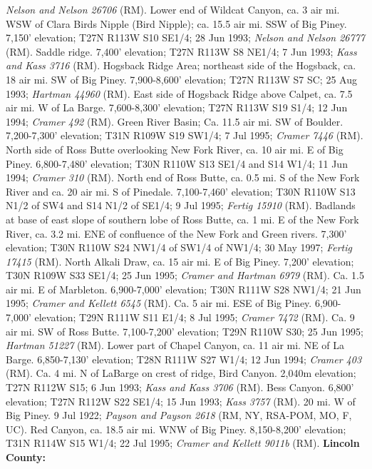 \textit{Nelson and Nelson 26706} (RM).
Lower end of Wildcat Canyon, ca. 3 air mi. WSW of Clara Birds Nipple
(Bird Nipple); ca. 15.5 air mi. SSW of Big Piney. 7,150’ elevation;
T27N R113W S10 SE1/4; 28 Jun 1993; \textit{Nelson and Nelson 26777} (RM).
Saddle ridge. 7,400’ elevation; T27N R113W S8 NE1/4; 7 Jun 1993;
\textit{Kass and Kass 3716} (RM).
Hogsback Ridge Area; northeast side of the Hogsback, ca. 18 air mi. SW of
Big Piney. 7,900-8,600’ elevation; T27N R113W S7 SC; 25 Aug 1993;
\textit{Hartman 44960} (RM).
East side of Hogsback Ridge above Calpet, ca. 7.5 air mi. W of La Barge.
7,600-8,300’ elevation; T27N R113W S19 S1/4; 12 Jun 1994;
\textit{Cramer 492} (RM).
Green River Basin; Ca. 11.5 air mi. SW of Boulder. 7,200-7,300’ elevation;
T31N R109W S19 SW1/4; 7 Jul 1995; \textit{Cramer 7446} (RM).
North side of Ross Butte overlooking New Fork River, ca. 10 air mi. E of
Big Piney. 6,800-7,480’ elevation; T30N R110W S13 SE1/4 and S14 W1/4;
11 Jun 1994; \textit{Cramer 310} (RM).
North end of Ross Butte, ca. 0.5 mi. S of the New Fork River and ca. 20 air mi.
S of Pinedale. 7,100-7,460’ elevation; T30N R110W S13 N1/2 of SW4 and S14 N1/2
of SE1/4; 9 Jul 1995; \textit{Fertig 15910} (RM).
Badlands at base of east slope of southern lobe of Ross Butte, ca. 1 mi. E of
the New Fork River, ca. 3.2 mi. ENE of confluence of the New Fork and Green
rivers. 7,300’ elevation; T30N R110W S24 NW1/4 of SW1/4 of NW1/4; 30 May 1997;
\textit{Fertig 17415} (RM).
North Alkali Draw, ca. 15 air mi. E of Big Piney. 7,200’ elevation;
T30N R109W S33 SE1/4; 25 Jun 1995; \textit{Cramer and Hartman 6979} (RM).
Ca. 1.5 air mi. E of Marbleton. 6,900-7,000’ elevation; T30N R111W S28 NW1/4;
21 Jun 1995; \textit{Cramer and Kellett 6545} (RM).
Ca. 5 air mi. ESE of Big Piney. 6,900-7,000’ elevation; T29N R111W S11 E1/4;
8 Jul 1995; \textit{Cramer 7472} (RM).
Ca. 9 air mi. SW of Ross Butte. 7,100-7,200’ elevation; T29N R110W S30;
25 Jun 1995; \textit{Hartman 51227} (RM).
Lower part of Chapel Canyon, ca. 11 air mi. NE of La Barge.
6,850-7,130’ elevation; T28N R111W S27 W1/4; 12 Jun 1994;
\textit{Cramer 403} (RM).
Ca. 4 mi. N of LaBarge on crest of ridge, Bird Canyon. 2,040m elevation;
T27N R112W S15; 6 Jun 1993; \textit{Kass and Kass 3706} (RM).
Bess Canyon. 6,800’ elevation; T27N R112W S22 SE1/4; 15 Jun 1993;
\textit{Kass 3757} (RM).
20 mi. W of Big Piney. 9 Jul 1922;
\textit{Payson and Payson 2618} (RM, NY, RSA-POM, MO, F, UC).
Red Canyon, ca. 18.5 air mi. WNW of Big Piney. 8,150-8,200’ elevation;
T31N R114W S15 W1/4; 22 Jul 1995; \textit{Cramer and Kellett 9011b} (RM).
  \textbf{Lincoln County:}
